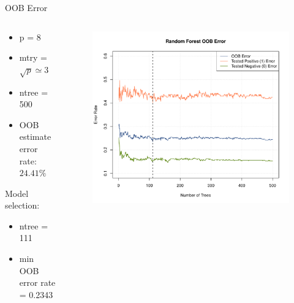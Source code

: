 \begin{frame}{OOB Error}
\begin{columns}
\begin{column}{0.35\textwidth}

{\footnotesize \begin{itemize}
    \item p = 8
    \item mtry = $\sqrt{p} \simeq 3$
    \item ntree = 500
    \item OOB estimate error rate: $24.41\%$
\end{itemize}}

\vspace{0.5cm}

\; Model selection:
{\footnotesize \begin{itemize}
\item ntree = 111
    \item min OOB error rate = 0.2343
\end{itemize}}

\end{column}
\begin{column}{0.75\textwidth}
\begin{figure}
\includegraphics[width=1.05\columnwidth]{slide/Figures/forest/diabete_forest_error3.pdf}
\end{figure}
\end{column}
\end{columns}
\end{frame}

